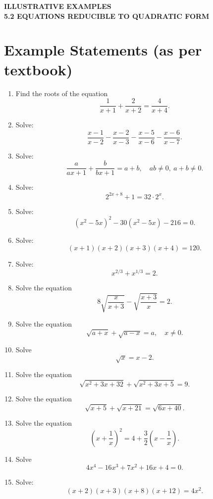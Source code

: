 \documentclass[12pt,a4paper]{article}
\begin{document}
	
	\begin{center}
		\Large\textbf{ILLUSTRATIVE EXAMPLES}\\[0.3cm]
		\normalsize\textbf{5.2 EQUATIONS REDUCIBLE TO QUADRATIC FORM}
	\end{center}
	
	\vspace{0.3cm}
	
	\section*{Example Statements (as per textbook)}
	
	\begin{enumerate}[label=\textbf{Example \arabic*.}, leftmargin=2.5em]
		\item Find the roots of the equation 
		\[\frac{1}{x+1} + \frac{2}{x+2} = \frac{4}{x+4}.\]
		
		\item Solve: 
		\[\frac{x-1}{x-2} - \frac{x-2}{x-3} - \frac{x-5}{x-6} - \frac{x-6}{x-7}.\]
		
		\item Solve: 
		\[\frac{a}{ax+1} + \frac{b}{bx+1} = a + b,\quad ab \neq 0,\ a + b \neq 0.\]
		
		\item Solve: 
		\[2^{2x+8} + 1 = 32 \cdot 2^x.\]
		
		\item Solve: 
		\[(x^2 - 5x)^2 - 30(x^2 - 5x) - 216 = 0.\]
		
		\item Solve: 
		\[(x + 1)(x + 2)(x + 3)(x + 4) = 120.\]
		
		\item Solve: 
		\[x^{2/3} + x^{1/3} = 2.\]
		
		\item Solve the equation 
		\[8 \sqrt{\frac{x}{x+3}} - \sqrt{\frac{x+3}{x}} = 2.\]
		
		\item Solve the equation 
		\[\sqrt{a+x} + \sqrt{a-x} = a,\quad x \neq 0.\]
		
		\item Solve 
		\[\sqrt{x} = x - 2.\]
		
		\item Solve the equation 
		\[\sqrt{x^2 + 3x + 32} + \sqrt{x^2 + 3x + 5} = 9.\]
		
		\item Solve the equation 
		\[\sqrt{x+5} + \sqrt{x+21} = \sqrt{6x+40}.\]
		
		\item Solve the equation 
		\[\left(x + \frac{1}{x}\right)^2 = 4 + \frac{3}{2}\left(x - \frac{1}{x}\right).\]
		
		\item Solve 
		\[4x^4 - 16x^3 + 7x^2 + 16x + 4 = 0.\]
		
		\item Solve: 
		\[(x + 2)(x + 3)(x + 8)(x + 12) = 4x^2.\]
	\end{enumerate}
	
\end{document}
